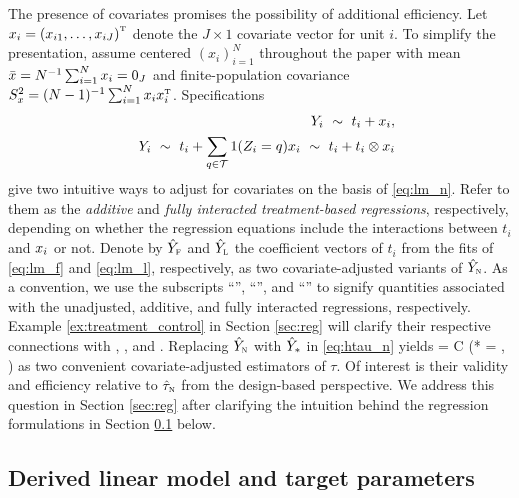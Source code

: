 \documentclass[11pt]{article}
\theoremstyle{definition}
\begin{document}
The presence of covariates promises the possibility of additional efficiency.
Let $ x_i = \left(x_{i1}, \dots, x_{iJ}\right)^{ \mathrm{\scriptscriptstyle T} }$ denote the $J\times 1$ covariate vector for unit $i$.
To simplify the presentation, assume centered $(x_i)_{i=1}^N$ throughout the paper with mean $\bar x  = N^{-1} \sum_{i=1}^N  x_i = 0_J$ and finite-population covariance $S^2_{x}  = (N-1)^{-1}\sum_{i=1}^N  x_i x_i^{ \mathrm{\scriptscriptstyle T} }$.  
Specifications 
\begin{eqnarray}
&& Y_i 
\ \sim \  t_i  + {x_i },\label{eq:lm_f}\\
&&  Y_i 
\ \sim \   t_i +  \sum_{q \in\mathcal{T}}  1(Z_i=q) { x_i } 
\ \sim  \ t_i + t_i \otimes x_i \label{eq:lm_l}
\end{eqnarray}
give two intuitive ways to adjust for covariates on the basis of \eqref{eq:lm_n}. Refer to them as the {\it additive} and {\it fully interacted treatment-based regressions}, respectively, depending on whether the regression equations include the interactions between $t_i$ and $x_i$ or not. 
Denote by $\hat Y_{\textsc{f}}$ and $\hat Y_{\textsc{l}}$ the coefficient vectors of $t_i $ from the \olss fits of \eqref{eq:lm_f} and \eqref{eq:lm_l}, respectively, as two covariate-adjusted variants of $\hat Y_{\textsc{n}}$. 
As a convention, we use the subscripts ``\neyman'', ``\fisher'', and ``\lin'' to signify quantities associated with the unadjusted, additive, and fully interacted regressions, respectively. Example \ref{ex:treatment_control} in Section \ref{sec:reg} will clarify their respective connections with \cite{Neyman23}, \cite{Fisher35}, and \cite{Lin13}. %
Replacing $\hat Y_{\textsc{n}}$ with $\hat Y_*$ in \eqref{eq:htau_n} yields 
\begina
\hts = C \hys \qquad (* = \fisher, \lin) 
\enda
as two convenient covariate-adjusted estimators of $\tau$.  
Of interest is their validity and efficiency relative to $\hat\tau_{\textsc{n}}$ from the design-based perspective. 
We address this question in Section \ref{sec:reg} after clarifying the intuition behind the regression formulations in Section \ref{sec:derived linear model} below. 

\subsection{Derived linear model and target parameters}\label{sec:derived linear model}
\end{document}
